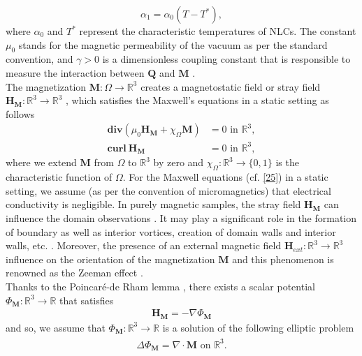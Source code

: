 \documentclass{article}
\def\Qvec{\mathbf{Q}}
\def \Mvec{\mathbf{M}}
\def\Hvec{\mathbf{H}}
\begin{document}
$$\alpha_1 = \alpha_0\left(T - T^*\right),$$
where $\alpha_0$ and $T^*$ represent the characteristic temperatures of NLCs. The constant $\mu_0$ stands for the magnetic permeability of the vacuum  as per the standard convention, and $\gamma>0$ is a dimensionless coupling constant that is responsible to measure the interaction between $\Qvec$ and $\Mvec$ \cite{Mertelj}.\\
The magnetization $\Mvec:\Omega\rightarrow\mathbb R^3$ creates a magnetostatic field or stray field $\Hvec_{\Mvec}:\mathbb R^3\rightarrow\mathbb R^3$ \cite{brown1966magnetoelastic}, which satisfies the Maxwell's equations in a static setting as follows
\begin{eqnarray}\label{25}
\textbf{div} \left(\mu_0 \Hvec_{\Mvec} + \chi_{\Omega} \Mvec\right) &= 0 \mbox { in } \mathbb R^3,\nonumber\\
\textbf{curl}~\Hvec_{\Mvec} &= 0 \mbox { in } \mathbb R^3,
\end{eqnarray}
where we extend $\Mvec$ from $\Omega$ to $\mathbb R^3$ by zero and $\chi_{\Omega}: \mathbb R^3\rightarrow \{0,1\}$ is the characteristic function of $\Omega$. For the Maxwell equations (cf. \eqref{25}) in a static setting, we assume (as per the convention of micromagnetics) that electrical conductivity is negligible. In purely magnetic samples, the stray field $\Hvec_{\Mvec}$ can influence the domain observations \cite{hubert2008magnetic}. It may play a significant role in the formation of boundary as well as interior vortices, creation of domain walls and interior walls, etc. \cite{hubert2008magnetic, desimone2004recent}. Moreover, the presence of an external magnetic field $\Hvec_{ext}: \mathbb R^3\rightarrow\mathbb R^3$ influence on the orientation of the magnetization $\Mvec$ and this phenomenon is renowned as the Zeeman effect \cite{hubert2008magnetic}.\newline\\
Thanks to the Poincaré-de Rham lemma \cite{spivak2018calculus}, there exists a scalar potential $\Phi_{\Mvec}: \mathbb R^3\rightarrow\mathbb R$ that satisfies
\begin{eqnarray}
\Hvec_{\Mvec}=-\nabla\Phi_{\Mvec}
\end{eqnarray}
and so, we assume that $\Phi_{\Mvec}: \mathbb R^3\rightarrow\mathbb R$ is a solution of the following elliptic problem
\begin{eqnarray}
\begin{aligned}
\Delta\Phi_{\Mvec} = \nabla\cdot\Mvec \mbox{ on } \mathbb R^3.\\
\end{aligned}
\end{eqnarray}
\end{document}
